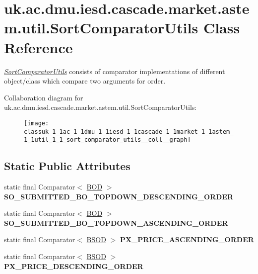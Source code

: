 \hypertarget{classuk_1_1ac_1_1dmu_1_1iesd_1_1cascade_1_1market_1_1astem_1_1util_1_1_sort_comparator_utils}{\section{uk.\-ac.\-dmu.\-iesd.\-cascade.\-market.\-astem.\-util.\-Sort\-Comparator\-Utils Class Reference}
\label{classuk_1_1ac_1_1dmu_1_1iesd_1_1cascade_1_1market_1_1astem_1_1util_1_1_sort_comparator_utils}
}


{\itshape \hyperlink{classuk_1_1ac_1_1dmu_1_1iesd_1_1cascade_1_1market_1_1astem_1_1util_1_1_sort_comparator_utils}{Sort\-Comparator\-Utils}} consists of comparator implementations of different object/class which compare two arguments for order.  




Collaboration diagram for uk.\-ac.\-dmu.\-iesd.\-cascade.\-market.\-astem.\-util.\-Sort\-Comparator\-Utils\-:\nopagebreak
\begin{figure}[H]
\begin{center}
\leavevmode
\texttt{[image: classuk\_1\_1ac\_1\_1dmu\_1\_1iesd\_1\_1cascade\_1\_1market\_1\_1astem\_1\_1util\_1\_1\_sort\_comparator\_utils\_\_coll\_\_graph]}
\end{center}
\end{figure}
\subsection*{Static Public Attributes}
\begin{DoxyCompactItemize}
\item 
static final Comparator$<$ \hyperlink{classuk_1_1ac_1_1dmu_1_1iesd_1_1cascade_1_1agents_1_1aggregators_1_1_b_o_d}{B\-O\-D} $>$ {\bfseries S\-O\-\_\-\-S\-U\-B\-M\-I\-T\-T\-E\-D\-\_\-\-B\-O\-\_\-\-T\-O\-P\-D\-O\-W\-N\-\_\-\-D\-E\-S\-C\-E\-N\-D\-I\-N\-G\-\_\-\-O\-R\-D\-E\-R}
\item 
static final Comparator$<$ \hyperlink{classuk_1_1ac_1_1dmu_1_1iesd_1_1cascade_1_1agents_1_1aggregators_1_1_b_o_d}{B\-O\-D} $>$ {\bfseries S\-O\-\_\-\-S\-U\-B\-M\-I\-T\-T\-E\-D\-\_\-\-B\-O\-\_\-\-T\-O\-P\-D\-O\-W\-N\-\_\-\-A\-S\-C\-E\-N\-D\-I\-N\-G\-\_\-\-O\-R\-D\-E\-R}
\item 
static final Comparator$<$ \hyperlink{classuk_1_1ac_1_1dmu_1_1iesd_1_1cascade_1_1market_1_1data_1_1_b_s_o_d}{B\-S\-O\-D} $>$ {\bfseries P\-X\-\_\-\-P\-R\-I\-C\-E\-\_\-\-A\-S\-C\-E\-N\-D\-I\-N\-G\-\_\-\-O\-R\-D\-E\-R}
\item 
static final Comparator$<$ \hyperlink{classuk_1_1ac_1_1dmu_1_1iesd_1_1cascade_1_1market_1_1data_1_1_b_s_o_d}{B\-S\-O\-D} $>$ {\bfseries P\-X\-\_\-\-P\-R\-I\-C\-E\-\_\-\-D\-E\-S\-C\-E\-N\-D\-I\-N\-G\-\_\-\-O\-R\-D\-E\-R}
\end{DoxyCompactItemize}


